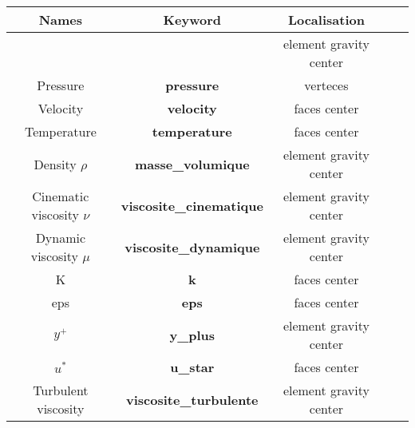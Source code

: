 \begin{longtable}[h!]{|c|c|c|c|c|}
\hline 
\textbf{Names}              & \textbf{Keyword}                  & \textbf{Localisation}     \\ \hline
\hline
                            &                                   & element gravity center    \\
Pressure                    & \textbf{pressure}                 & verteces                  \\ \hline
Velocity                    & \textbf{velocity}                 & faces center              \\ \hline
Temperature                 & \textbf{temperature}              & faces center              \\ \hline
\hline
Density $\rho$              & \textbf{masse\_volumique}         & element gravity center    \\ \hline
Cinematic viscosity $\nu$   & \textbf{viscosite\_cinematique}   & element gravity center    \\ \hline
Dynamic viscosity $\mu$     & \textbf{viscosite\_dynamique}     & element gravity center    \\ \hline
\hline
K                           & \textbf{k}                        & faces center              \\ \hline
eps                         & \textbf{eps}                      & faces center              \\ \hline
$y^+$                       & \textbf{y\_plus}                  & element gravity center    \\ \hline
$u^*$                       & \textbf{u\_star}                  & faces center              \\ \hline
Turbulent viscosity         & \textbf{viscosite\_turbulente}    & element gravity center    \\ \hline
\end{longtable}



